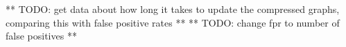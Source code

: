 \documentclass[11pt]{article}
\begin{document}
** TODO: get data about how long it takes to update the compressed graphs, comparing this with false positive rates **
** TODO: change fpr to number of false positives **



\end{document}
